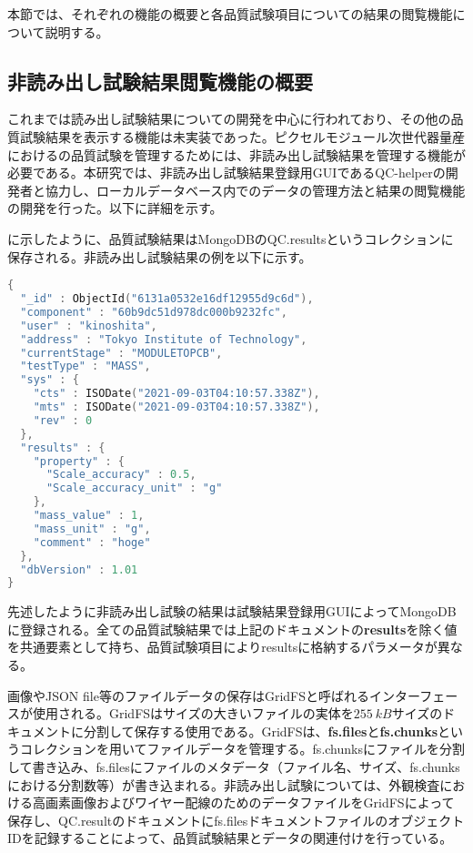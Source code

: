 本節では、それぞれの機能の概要と各品質試験項目についての結果の閲覧機能について説明する。


\subsection{非読み出し試験結果閲覧機能の概要}
\label{sec:non-elec-data}

これまでは読み出し試験結果についての開発を中心に行われており、その他の品質試験結果を表示する機能は未実装であった。ピクセルモジュール次世代器量産におけるの品質試験を管理するためには、非読み出し試験結果を管理する機能が必要である。本研究では、非読み出し試験結果登録用GUIであるQC-helperの開発者と協力し、ローカルデータベース内でのデータの管理方法と結果の閲覧機能の開発を行った。以下に詳細を示す。

に示したように、品質試験結果はMongoDBのQC.resultsというコレクションに保存される。非読み出し試験結果の例を以下に示す。

\begin{lstlisting}[caption=品質試験結果を表すドキュメントの例。以下は質量測定結果の一つを表している。,label=code:nonele, language=C++]
{
  "_id" : ObjectId("6131a0532e16df12955d9c6d"),
  "component" : "60b9dc51d978dc000b9232fc",
  "user" : "kinoshita",
  "address" : "Tokyo Institute of Technology",
  "currentStage" : "MODULETOPCB",
  "testType" : "MASS",
  "sys" : {
    "cts" : ISODate("2021-09-03T04:10:57.338Z"),
    "mts" : ISODate("2021-09-03T04:10:57.338Z"),
    "rev" : 0
  },
  "results" : {
    "property" : {
      "Scale_accuracy" : 0.5,
      "Scale_accuracy_unit" : "g"
    },
    "mass_value" : 1,
    "mass_unit" : "g",
    "comment" : "hoge"
  },
  "dbVersion" : 1.01
}
\end{lstlisting}

先述したように非読み出し試験の結果は試験結果登録用GUIによってMongoDBに登録される。全ての品質試験結果では上記のドキュメントの\textbf{results}を除く値を共通要素として持ち、品質試験項目によりresultsに格納するパラメータが異なる。

画像やJSON file等のファイルデータの保存はGridFS\cite{mongo}と呼ばれるインターフェースが使用される。GridFSはサイズの大きいファイルの実体を$255\ \si{kB}$サイズのドキュメントに分割して保存する使用である。GridFSは、\textbf{fs.files}と\textbf{fs.chunks}というコレクションを用いてファイルデータを管理する。fs.chunksにファイルを分割して書き込み、fs.filesにファイルのメタデータ（ファイル名、サイズ、fs.chunksにおける分割数等）が書き込まれる。非読み出し試験については、外観検査における高画素画像およびワイヤー配線のためのデータファイルをGridFSによって保存し、QC.resultのドキュメントにfs.filesドキュメントファイルのオブジェクトIDを記録することによって、品質試験結果とデータの関連付けを行っている。


